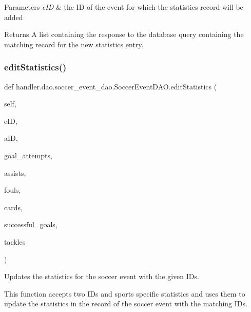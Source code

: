 \begin{DoxyParams}{Parameters}
{\em e\+ID} & the ID of the event for which the statistics record will be added\\
\hline
\end{DoxyParams}
\begin{DoxyReturn}{Returns}
A list containing the response to the database query containing the matching record for the new statistics entry. 
\end{DoxyReturn}
\mbox{\label{classhandler_1_1dao_1_1soccer__event__dao_1_1_soccer_event_d_a_o_af5db499bafc4bc551418eb8d7f3fce08}} 
\subsubsection{\texorpdfstring{edit\+Statistics()}{editStatistics()}}
{\footnotesize\ttfamily def handler.\+dao.\+soccer\+\_\+event\+\_\+dao.\+Soccer\+Event\+D\+A\+O.\+edit\+Statistics (\begin{DoxyParamCaption}\item[{}]{self,  }\item[{}]{e\+ID,  }\item[{}]{a\+ID,  }\item[{}]{goal\+\_\+attempts,  }\item[{}]{assists,  }\item[{}]{fouls,  }\item[{}]{cards,  }\item[{}]{successful\+\_\+goals,  }\item[{}]{tackles }\end{DoxyParamCaption})}



Updates the statistics for the soccer event with the given I\+Ds. 

This function accepts two I\+Ds and sports specific statistics and uses them to update the statistics in the record of the soccer event with the matching I\+Ds.


